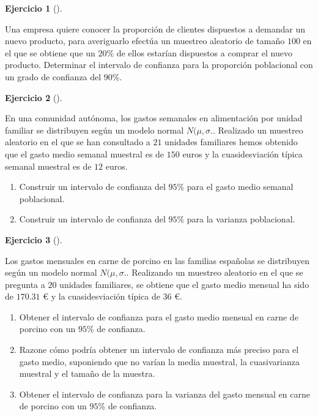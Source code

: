 \documentclass[
  a4paper,
]{scrreport}
\theoremstyle{definition}
\newtheorem{exercise}{Ejercicio}[chapter]
\theoremstyle{remark}
\begin{document}
\begin{exercise}[]\protect\hypertarget{exr-intervalo-confianza-proporcion-demanda}{}\label{exr-intervalo-confianza-proporcion-demanda}

Una empresa quiere conocer la proporción de clientes dispuestos a
demandar un nuevo producto, para averiguarlo efectúa un muestreo
aleatorio de tamaño \(100\) en el que se obtiene que un \(20\)\% de
ellos estarían dispuestos a comprar el nuevo producto. Determinar el
intervalo de confianza para la proporción poblacional con un grado de
confianza del \(90\)\%.

\end{exercise}

\begin{exercise}[]\protect\hypertarget{exr-intervalo-confianza-media-varianza-gasto-alimentacion}{}\label{exr-intervalo-confianza-media-varianza-gasto-alimentacion}

En una comunidad autónoma, los gastos semanales en alimentación por
unidad familiar se distribuyen según un modelo normal \(N(\mu,\sigma.\).
Realizado un muestreo aleatorio en el que se han consultado a \(21\)
unidades familiares hemos obtenido que el gasto medio semanal muestral
es de \(150\) euros y la cuasidesviación típica semanal muestral es de
\(12\) euros.

\begin{enumerate}
\def\labelenumi{\alph{enumi}.}
\item
  Construir un intervalo de confianza del \(95\)\% para el gasto medio
  semanal poblacional.
\item
  Construir un intervalo de confianza del \(95\)\% para la varianza
  poblacional.
\end{enumerate}

\end{exercise}

\begin{exercise}[]\protect\hypertarget{exr-intervalo-confianza-media-varianza-gasto-porcino}{}\label{exr-intervalo-confianza-media-varianza-gasto-porcino}

Los gastos mensuales en carne de porcino en las familias españolas se
distribuyen según un modelo normal \(N(\mu, \sigma.\). Realizando un
muestreo aleatorio en el que se pregunta a \(20\) unidades familiares,
se obtiene que el gasto medio mensual ha sido de \(170.31\) € y la
cuasidesviación típica de \(36\) €.

\begin{enumerate}
\def\labelenumi{\alph{enumi}.}
\item
  Obtener el intervalo de confianza para el gasto medio mensual en carne
  de porcino con un \(95\)\% de confianza.
\item
  Razone cómo podría obtener un intervalo de confianza más preciso para
  el gasto medio, suponiendo que no varían la media muestral, la
  cuasivarianza muestral y el tamaño de la muestra.
\item
  Obtener el intervalo de confianza para la varianza del gasto mensual
  en carne de porcino con un \(95\)\% de confianza.
\end{enumerate}

\end{exercise}
\end{document}
